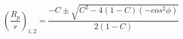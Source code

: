 \begin{equation*}
\left(\frac{R_{p}}{r}\right)_{1,2} = \frac{-C \pm \sqrt{C^{2} - 4(1 - C)(-cos^{2}\phi )}}{2(1 - C)} \tag{4.29}
\end{equation*}
